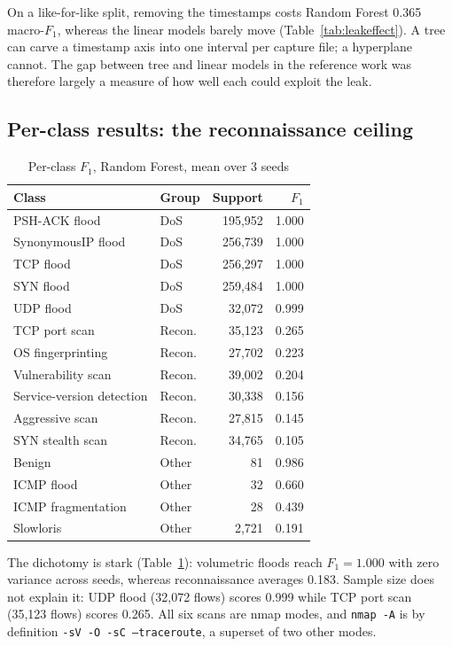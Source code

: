 \documentclass[conference]{IEEEtran}
\begin{document}
On a like-for-like split, removing the timestamps costs Random Forest 0.365 macro-$F_1$, whereas the linear models barely move (Table~\ref{tab:leakeffect}). A tree can carve a timestamp axis into one interval per capture file; a hyperplane cannot. The gap between tree and linear models in the reference work was therefore largely a measure of how well each could exploit the leak.

\subsection{Per-class results: the reconnaissance ceiling}

\begin{table}[!t]
\caption{Per-class $F_1$, Random Forest, mean over 3 seeds}
\label{tab:perclass}
\centering
\footnotesize
\begin{tabular}{@{}llrr@{}}
\toprule
\textbf{Class} & \textbf{Group} & \textbf{Support} & \textbf{$F_1$} \\
\midrule
PSH-ACK flood & DoS & 195,952 & 1.000 \\
SynonymousIP flood & DoS & 256,739 & 1.000 \\
TCP flood & DoS & 256,297 & 1.000 \\
SYN flood & DoS & 259,484 & 1.000 \\
UDP flood & DoS & 32,072 & 0.999 \\
\midrule
TCP port scan & Recon. & 35,123 & 0.265 \\
OS fingerprinting & Recon. & 27,702 & 0.223 \\
Vulnerability scan & Recon. & 39,002 & 0.204 \\
Service-version detection & Recon. & 30,338 & 0.156 \\
Aggressive scan & Recon. & 27,815 & 0.145 \\
SYN stealth scan & Recon. & 34,765 & 0.105 \\
\midrule
Benign & Other & 81 & 0.986 \\
ICMP flood & Other & 32 & 0.660 \\
ICMP fragmentation & Other & 28 & 0.439 \\
Slowloris & Other & 2,721 & 0.191 \\
\bottomrule
\end{tabular}
\end{table}

The dichotomy is stark (Table~\ref{tab:perclass}): volumetric floods reach $F_1 = 1.000$ with zero variance across seeds, whereas reconnaissance averages 0.183. Sample size does not explain it: UDP flood (32,072 flows) scores 0.999 while TCP port scan (35,123 flows) scores 0.265. All six scans are nmap modes, and \texttt{nmap -A} is by definition \texttt{-sV -O -sC --traceroute}, a superset of two other modes.
\end{document}
